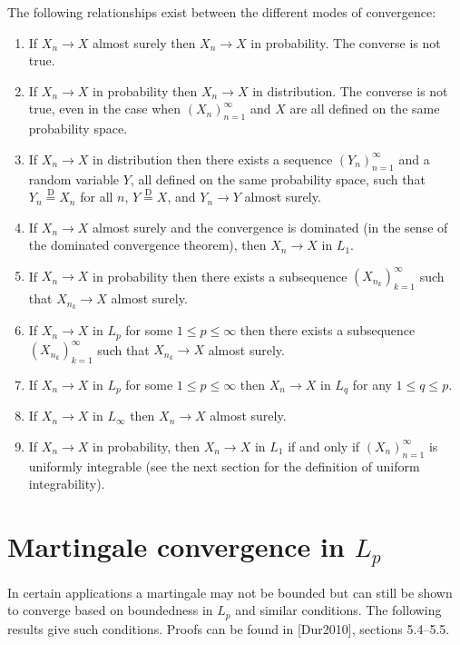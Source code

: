 \begin{thm}
The following relationships exist between the
different modes of convergence:

\begin{enumerate}[label=\arabic*.]
\item If $X_n\to X$ almost surely then $X_n\to X$ in
probability. The converse is not true.

\item If $X_n\to X$ in probability then $X_n \to X$ in
distribution. The converse is not true, even in the
case when $(X_n)_{n=1}^\infty$ and $X$ are all
defined on the same probability space.

\item If $X_n\to X$ in distribution then there exists a
sequence $(Y_n)_{n=1}^\infty$ and a random variable
$Y$, all defined on the same probability space, such
that $Y_n \stackrel{\textrm{D}}{=} X_n$ for all $n$,
$Y\stackrel{\textrm{D}}{=} X$, and $Y_n\to Y$ almost
surely.

\item If $X_n\to X$ almost surely and the convergence is
dominated (in the sense of the dominated convergence
theorem), then $X_n\to X$ in $L_1$.

\item If $X_n\to X$ in probability then there exists a
subsequence $(X_{n_k})_{k=1}^\infty$ such that
$X_{n_k}\to X$ almost surely.

\item If $X_n\to X$ in $L_p$ for some $1\le p \le\infty$
then there exists a subsequence
$(X_{n_k})_{k=1}^\infty$ such that $X_{n_k}\to X$
almost surely.

\item If $X_n\to X$ in $L_p$ for some $1\le p\le\infty$
then $X_n\to X$ in $L_q$ for any $1\le q\le p$.

\item If $X_n \to X$ in $L_\infty$ then $X_n\to X$ almost
surely.

\item If $X_n\to X$ in probability, then $X_n\to X$ in $L_1$
if and only if $(X_n)_{n=1}^\infty$ is uniformly
integrable (see the next section for the definition of
uniform integrability).
\end{enumerate}

\end{thm}

\section{Martingale convergence in $L_p$}
In certain applications a martingale may not be
bounded but can still be shown to converge based on
boundedness in $L_p$ and similar conditions. The
following results give such conditions. Proofs can be
found in [Dur2010], sections 5.4--5.5.

